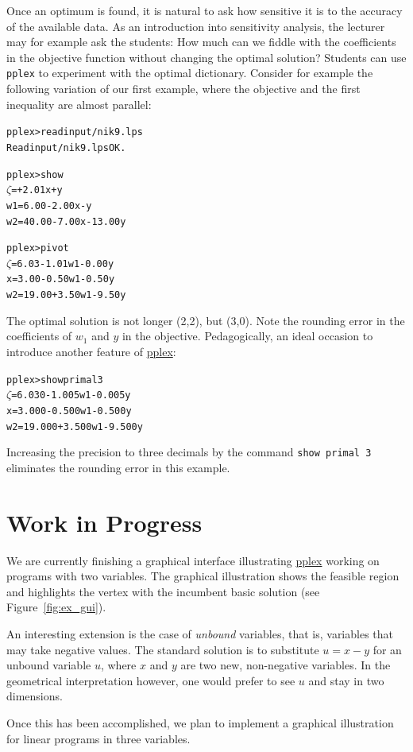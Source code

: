 \documentclass[ukenglish]{nik}
\begin{document}
Once an optimum is found, it is natural to ask how sensitive it is to the accuracy of the available data. 
As an introduction into sensitivity analysis, the lecturer may for example ask the students: 
How much can we fiddle with the coefficients in the objective function without changing the optimal solution?
Students can use \texttt{pplex} to experiment with the optimal dictionary.
Consider for example the following variation of our first example,
where the objective and the first inequality are almost parallel:
\begin{alltt}
pplex> read input/nik9.lps
Read input/nik9.lps OK.

pplex> show        
 \(\zeta\) =       + 2.01x +      y
w1 =  6.00 - 2.00x -      y
w2 = 40.00 - 7.00x - 13.00y

pplex> pivot
 \(\zeta\) =  6.03 - 1.01w1 - 0.00y
 x =  3.00 - 0.50w1 - 0.50y
w2 = 19.00 + 3.50w1 - 9.50y
\end{alltt}
The optimal solution is not longer (2,2), but (3,0). 
Note the rounding error in the coefficients of $w_1$ and $y$ in the objective.
Pedagogically, an ideal occasion to introduce another feature of \url{pplex}: 
\begin{alltt}
pplex> show primal 3
 \(\zeta\) =  6.030 - 1.005w1 - 0.005y
 x =  3.000 - 0.500w1 - 0.500y
w2 = 19.000 + 3.500w1 - 9.500y
\end{alltt}
Increasing the precision to three decimals by the command \texttt{show primal 3} eliminates the rounding error in this example.

\section{Work in Progress}\label{sec:future}
 
We are currently finishing a graphical interface illustrating \url{pplex} working on programs with two variables. 
The graphical illustration shows the feasible
region and highlights the vertex with the incumbent basic solution (see Figure~\ref{fig:ex_gui}).

An interesting extension is the case of \emph{unbound} variables, that is, variables that may take
negative values. The standard solution is to substitute $u = x-y$ for an unbound variable $u$,
where $x$ and $y$ are two new, non-negative variables. In the geometrical interpretation however, one would
prefer to see $u$ and stay in two dimensions.

Once this has been accomplished, we plan to implement a graphical
illustration for linear programs in three variables.
\end{document}
